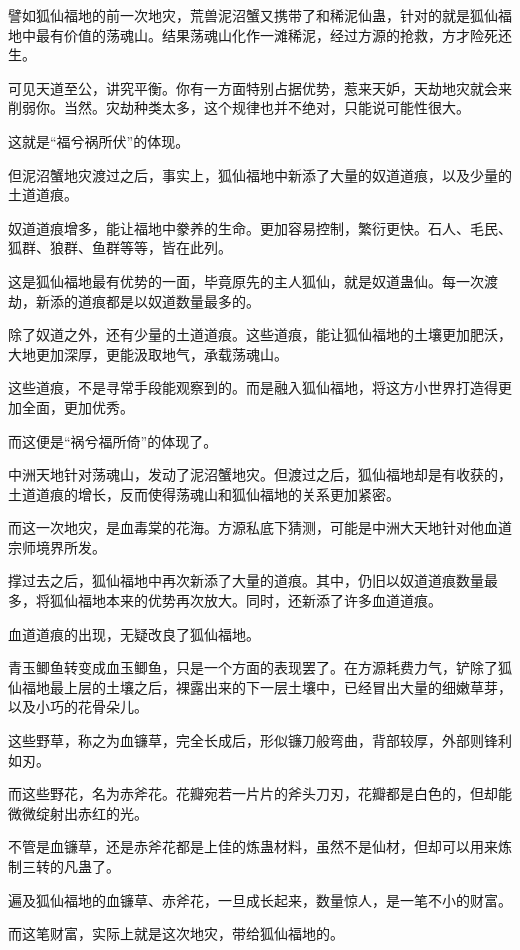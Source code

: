 \begin{this_body}
譬如狐仙福地的前一次地灾，荒兽泥沼蟹又携带了和稀泥仙蛊，针对的就是狐仙福地中最有价值的荡魂山。结果荡魂山化作一滩稀泥，经过方源的抢救，方才险死还生。

可见天道至公，讲究平衡。你有一方面特别占据优势，惹来天妒，天劫地灾就会来削弱你。当然。灾劫种类太多，这个规律也并不绝对，只能说可能性很大。

这就是“福兮祸所伏”的体现。

但泥沼蟹地灾渡过之后，事实上，狐仙福地中新添了大量的奴道道痕，以及少量的土道道痕。

奴道道痕增多，能让福地中豢养的生命。更加容易控制，繁衍更快。石人、毛民、狐群、狼群、鱼群等等，皆在此列。

这是狐仙福地最有优势的一面，毕竟原先的主人狐仙，就是奴道蛊仙。每一次渡劫，新添的道痕都是以奴道数量最多的。

除了奴道之外，还有少量的土道道痕。这些道痕，能让狐仙福地的土壤更加肥沃，大地更加深厚，更能汲取地气，承载荡魂山。

这些道痕，不是寻常手段能观察到的。而是融入狐仙福地，将这方小世界打造得更加全面，更加优秀。

而这便是“祸兮福所倚”的体现了。

中洲天地针对荡魂山，发动了泥沼蟹地灾。但渡过之后，狐仙福地却是有收获的，土道道痕的增长，反而使得荡魂山和狐仙福地的关系更加紧密。

而这一次地灾，是血毒棠的花海。方源私底下猜测，可能是中洲大天地针对他血道宗师境界所发。

撑过去之后，狐仙福地中再次新添了大量的道痕。其中，仍旧以奴道道痕数量最多，将狐仙福地本来的优势再次放大。同时，还新添了许多血道道痕。

血道道痕的出现，无疑改良了狐仙福地。

青玉鲫鱼转变成血玉鲫鱼，只是一个方面的表现罢了。在方源耗费力气，铲除了狐仙福地最上层的土壤之后，裸露出来的下一层土壤中，已经冒出大量的细嫩草芽，以及小巧的花骨朵儿。

这些野草，称之为血镰草，完全长成后，形似镰刀般弯曲，背部较厚，外部则锋利如刃。

而这些野花，名为赤斧花。花瓣宛若一片片的斧头刀刃，花瓣都是白色的，但却能微微绽射出赤红的光。

不管是血镰草，还是赤斧花都是上佳的炼蛊材料，虽然不是仙材，但却可以用来炼制三转的凡蛊了。

遍及狐仙福地的血镰草、赤斧花，一旦成长起来，数量惊人，是一笔不小的财富。

而这笔财富，实际上就是这次地灾，带给狐仙福地的。


\end{this_body}

